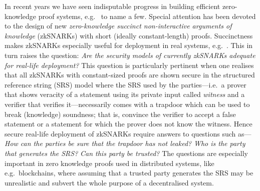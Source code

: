 \documentclass[runningheads,11pt]{llncs}
\theoremstyle{definition} \newtheorem{definition}[theorem]{Definition}
\begin{document}
In recent years we have seen indisputable progress in building efficient
zero-knowledge proof systems,
e.g.~\cite{AC:Groth10a,TCC:Lipmaa12,EC:GGPR13,SP:PHGR13,AC:Lipmaa13,AC:DFGK14,EC:Groth16,SP:BBBPWM18}
to name a few. Special attention has been devoted to the design of new
\emph{zero-knowledge succinct non-interactive arguments of knowledge} (zkSNARKs)
with short (ideally constant-length) proofs. Succinctness makes zkSNARKs
especially useful for deployment in real systems,
e.g.~\cite{REPO:Zcash20,ARXIV:RonZaj19,REPO:Zeth20,REPO:Celo20,REPO:Aztec20}.
This in turn raises the question: \emph{Are the security models of currently zkSNARKs adequate for real-life deployment?} This question is particularly pertinent when one realises that
all zkSNARKs with constant-sized proofs are shown secure in the structured reference
string (SRS) model where the SRS used by the parties---i.e.~a prover that shows
veracity of a statement using its private input called \emph{witness} and a
verifier that verifies it---necessarily comes with a trapdoor which can be used to break
(knowledge) soundness; that is, convince the verifier to accept a false
statement or a statement for which the prover does not know the witness. Hence
 secure real-life deployment of zkSNARKs require answers to questions such as---\emph{How can the parties be sure that the trapdoor has not leaked?}
\emph{Who is the party that generates the SRS?} \emph{Can this party be
  trusted?} The questions are especially
important in zero knowledge proofs used in distributed systems, like
e.g.~blockchains, where assuming that a trusted party generates the SRS may be unrealistic and subvert the whole purpose of a decentralised system.
\end{document}

